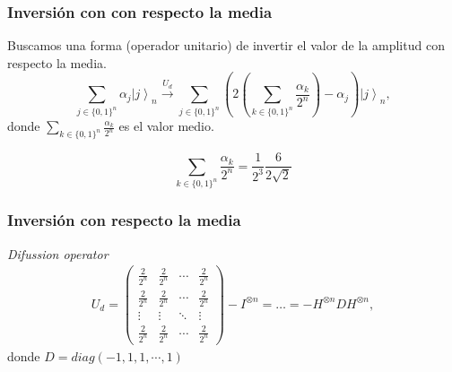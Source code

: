 \begin{frame}
	\frametitle{Inversión con con respecto la media}
	Buscamos una forma (operador unitario) de invertir el valor de la amplitud con respecto la media.
	\begin{equation*}
		\sum_{j\in\{0,1\}^{n}}\alpha_{j}\left.|j\right\rangle _{n}\stackrel{U_d}{\longrightarrow}\sum_{j\in\{0,1\}^{n}}\left(2\left(\sum_{k\in\{0,1\}^{n}}\frac{\alpha_{k}}{2^{n}}\right)-\alpha_{j}\right)\left.|j\right\rangle _{n},
	\end{equation*}
	donde $\sum_{k\in\{0,1\}^{n}}\frac{\alpha_{k}}{2^{n}}$ es el valor medio.
	\begin{exampleblock}{}
		\[\sum_{k\in\{0,1\}^{n}}\frac{\alpha_{k}}{2^{n}}=\frac{1}{2^3}\frac{6}{2\sqrt{2}}\]
	\end{exampleblock}
\end{frame}
\begin{frame}
	\frametitle{Inversión con respecto la media}
	\begin{block}{\textit{Difussion operator }}
		\begin{eqnarray}
			U_{d}=\left(\begin{array}{cccc}
			\frac{2}{2^{n}} & \frac{2}{2^{n}} & \cdots & \frac{2}{2^{n}}\\
			\frac{2}{2^{n}} & \frac{2}{2^{n}} & \cdots & \frac{2}{2^{n}}\\
			\vdots & \vdots & \ddots & \vdots\\
			\frac{2}{2^{n}} & \frac{2}{2^{n}} & \cdots & \frac{2}{2^{n}}
			\end{array}\right)-I^{\otimes n}=\dots=-H^{\otimes n}DH^{\otimes n},
		\end{eqnarray}
		donde $D=diag\left(-1,1,1,\cdots,1\right)$
	\end{block}
\end{frame}

